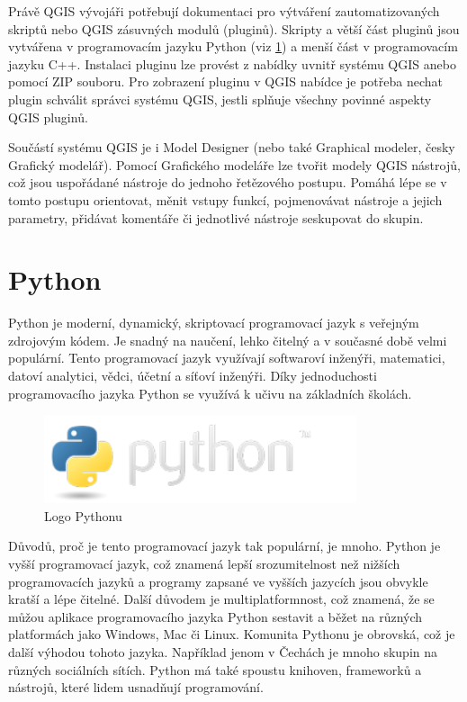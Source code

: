 Právě QGIS vývojáři potřebují dokumentaci pro výtváření zautomatizovaných skriptů nebo QGIS zásuvných modulů (pluginů).
Skripty a větší část pluginů jsou vytvářena v programovacím jazyku Python (viz \ref{section-python})
a menší část v programovacím jazyku C++. Instalaci pluginu lze provést z nabídky uvnitř systému QGIS
anebo pomocí ZIP souboru. Pro zobrazení pluginu v QGIS nabídce je potřeba nechat plugin
schválit správci systému QGIS, jestli splňuje všechny povinné aspekty QGIS pluginů.

Součástí systému QGIS je i Model Designer (nebo také Graphical modeler, česky Grafický modelář).
Pomocí Grafického modeláře lze tvořit modely QGIS nástrojů, což jsou uspořádané nástroje do jednoho řetězového postupu.
Pomáhá lépe se v tomto postupu orientovat, měnit vstupy funkcí, pojmenovávat nástroje a jejich parametry,
přidávat komentáře či jednotlivé nástroje seskupovat do skupin. 

\section{Python}
\label{section-python}
Python je moderní, dynamický, skriptovací programovací jazyk s veřejným zdrojovým kódem. 
Je snadný na naučení, lehko čitelný a v současné době velmi populární. Tento programovací jazyk využívají
softwaroví inženýři, matematici, datoví analytici, vědci, účetní a síťoví inženýři.
Díky jednoduchosti programovacího jazyka Python se využívá k učivu na základních školách.

\begin{figure}[H] \centering
    \includegraphics[width=260pt]{./pictures/python-logo.png}
    \caption[Logo Pythonu]{Logo Pythonu \cite{python}}
	\label{fig:python-logo}                                
\end{figure} 

Důvodů, proč je tento programovací jazyk tak populární, je mnoho. Python je vyšší programovací jazyk,
což znamená lepší srozumitelnost než nižších programovacích jazyků a programy zapsané
ve vyšších jazycích jsou obvykle kratší a lépe čitelné.  Další důvodem je multiplatformnost,
což znamená, že se můžou aplikace programovacího jazyka Python sestavit a běžet na různých platformách jako 
Windows, Mac či Linux. Komunita Pythonu je obrovská, což je další výhodou tohoto jazyka.
Například jenom v Čechách je mnoho skupin na různých sociálních sítích.
Python má také spoustu knihoven, frameworků a nástrojů, které lidem usnadňují programování.

